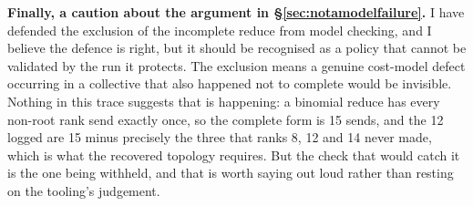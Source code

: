 \documentclass[11pt]{article}
\begin{document}
\textbf{Finally, a caution about the argument in \S\ref{sec:notamodelfailure}.} I have
defended the exclusion of the incomplete reduce from model checking, and I believe the
defence is right, but it should be recognised as a policy that cannot be validated by the
run it protects. The exclusion means a genuine cost-model defect occurring in a collective
that also happened not to complete would be invisible. Nothing in this trace suggests that
is happening: a binomial reduce has every non-root rank send exactly once, so the complete
form is 15 sends, and the 12 logged are 15 minus precisely the three that ranks 8, 12 and
14 never made, which is what the recovered topology requires. But the check that would
catch it is the one being withheld, and that is worth saying out loud rather than resting
on the tooling's judgement.
\end{document}
